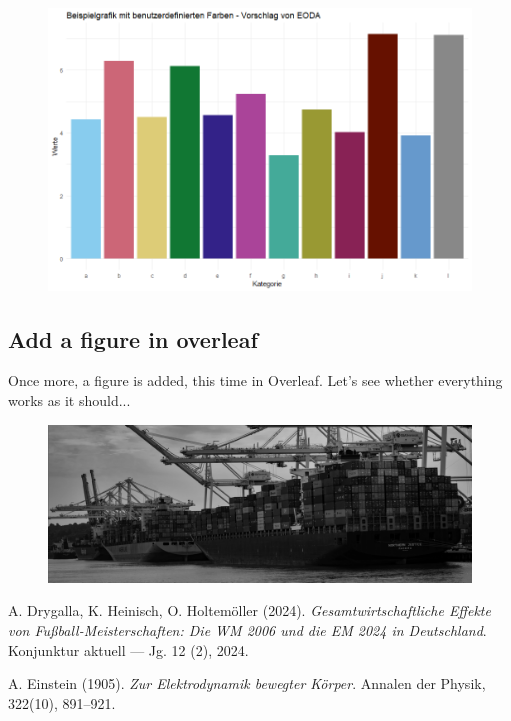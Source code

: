 \documentclass{article}
\begin{document}
\begin{figure}
  \centering
  \includegraphics[width=\linewidth]{figures/EODA_cols_plot.png}
\end{figure} 

\subsection{Add a figure in overleaf}
Once more, a figure is added, this time in Overleaf. Let's see whether everything works as it should...

\begin{figure}
  \centering
  \includegraphics[width=\linewidth]{figures/Titelbild5grau_3.jpg}
\end{figure} 



\begin{thebibliography}{9}

  A. Drygalla, K. Heinisch, O. Holtemöller (2024). 
  \textit{Gesamtwirtschaftliche Effekte von Fußball-Meisterschaften: Die WM 2006 und die EM 2024 in Deutschland}. 
  Konjunktur aktuell — Jg. 12 (2), 2024.


 A. Einstein (1905). 
 \textit{Zur Elektrodynamik bewegter Körper}. 
 Annalen der Physik, 322(10), 891--921.

\end{thebibliography}
\end{document}
